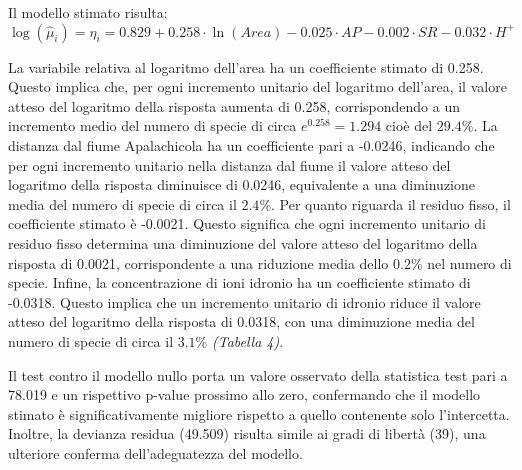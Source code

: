 \documentclass{article} %
\begin{document}
Il modello stimato risulta:
\[
    \log(\hat{\mu}_i)=\eta_i=0.829+0.258 \cdot \ln(Area)-0.025\cdot AP -0.002\cdot SR-0.032\cdot H^+
\]

La variabile relativa al logaritmo dell'area ha un coefficiente stimato di 0.258. Questo implica che, per ogni incremento unitario del logaritmo dell'area, il valore atteso del logaritmo della risposta aumenta di 0.258, corrispondendo a un incremento medio del numero di specie di circa $e^{0.258}=1.294$ cioè del $29.4\%$. 
La distanza dal fiume Apalachicola ha un coefficiente pari a -0.0246, indicando che per ogni incremento unitario nella distanza dal fiume il valore atteso del logaritmo della risposta diminuisce di 0.0246, equivalente a una diminuzione media del numero di specie di circa il $2.4\%$.
Per quanto riguarda il residuo fisso, il coefficiente stimato è -0.0021. Questo significa che ogni incremento unitario di residuo fisso determina una diminuzione del valore atteso del logaritmo della risposta di 0.0021, corrispondente a una riduzione media dello $0.2\%$ nel numero di specie.
Infine, la concentrazione di ioni idronio ha un coefficiente stimato di -0.0318. Questo implica che un incremento unitario di idronio riduce il valore atteso del logaritmo della risposta di 0.0318, con una diminuzione media del numero di specie di circa il $3.1\%$ \textit{(Tabella 4)}.

Il test contro il modello nullo porta un valore osservato della statistica test pari a 78.019 e un rispettivo p-value prossimo allo zero, confermando che il modello stimato è significativamente migliore rispetto a quello contenente solo l'intercetta. Inoltre, la devianza residua (49.509) risulta simile ai gradi di libertà (39), una ulteriore conferma dell'adeguatezza del modello.
\end{document}
